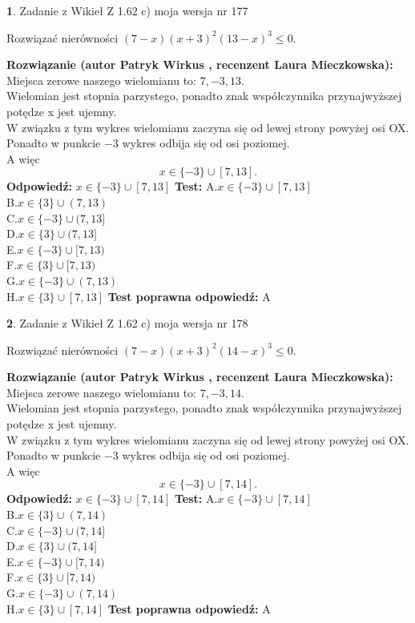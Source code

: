 \documentclass[12pt, a4paper]{article}
\theoremstyle{definition} %
\newtheorem{zad}{}
\newcommand{\zadStart}[1]{\begin{zad}#1\newline}
\newcommand{\zadStop}{\end{zad}}
\newcommand{\rozwStart}[2]{\noindent \textbf{Rozwiązanie (autor #1 , recenzent #2): }\newline}
\newcommand{\rozwStop}{\newline}
\newcommand{\odpStart}{\noindent \textbf{Odpowiedź:}\newline}
\newcommand{\odpStop}{\newline}
\newcommand{\testStart}{\noindent \textbf{Test:}\newline}
\newcommand{\testStop}{\newline}
\newcommand{\kluczStart}{\noindent \textbf{Test poprawna odpowiedź:}\newline}
\newcommand{\kluczStop}{\newline}
\begin{document}
\zadStart{Zadanie z Wikieł Z 1.62 c) moja wersja nr 177}

Rozwiązać nierówności $(7-x)(x+3)^{2}(13-x)^{3}\le0$.
\zadStop
\rozwStart{Patryk Wirkus}{Laura Mieczkowska}
Miejsca zerowe naszego wielomianu to: $7, -3, 13$.\\
Wielomian jest stopnia parzystego, ponadto znak współczynnika przy\linebreak najwyższej potędze x jest ujemny.\\ W związku z tym wykres wielomianu zaczyna się od lewej strony powyżej osi OX.\\
Ponadto w punkcie $-3$ wykres odbija się od osi poziomej.\\
A więc $$x \in \{-3\} \cup [7,13].$$
\rozwStop
\odpStart
$x \in \{-3\} \cup [7,13]$
\odpStop
\testStart
A.$x \in \{-3\} \cup [7,13]$\\
B.$x \in \{3\} \cup (7,13)$\\
C.$x \in \{-3\} \cup (7,13]$\\
D.$x \in \{3\} \cup (7,13]$\\
E.$x \in \{-3\} \cup [7,13)$\\
F.$x \in \{3\} \cup [7,13)$\\
G.$x \in \{-3\} \cup (7,13)$\\
H.$x \in \{3\} \cup [7,13]$
\testStop
\kluczStart
A
\kluczStop



\zadStart{Zadanie z Wikieł Z 1.62 c) moja wersja nr 178}

Rozwiązać nierówności $(7-x)(x+3)^{2}(14-x)^{3}\le0$.
\zadStop
\rozwStart{Patryk Wirkus}{Laura Mieczkowska}
Miejsca zerowe naszego wielomianu to: $7, -3, 14$.\\
Wielomian jest stopnia parzystego, ponadto znak współczynnika przy\linebreak najwyższej potędze x jest ujemny.\\ W związku z tym wykres wielomianu zaczyna się od lewej strony powyżej osi OX.\\
Ponadto w punkcie $-3$ wykres odbija się od osi poziomej.\\
A więc $$x \in \{-3\} \cup [7,14].$$
\rozwStop
\odpStart
$x \in \{-3\} \cup [7,14]$
\odpStop
\testStart
A.$x \in \{-3\} \cup [7,14]$\\
B.$x \in \{3\} \cup (7,14)$\\
C.$x \in \{-3\} \cup (7,14]$\\
D.$x \in \{3\} \cup (7,14]$\\
E.$x \in \{-3\} \cup [7,14)$\\
F.$x \in \{3\} \cup [7,14)$\\
G.$x \in \{-3\} \cup (7,14)$\\
H.$x \in \{3\} \cup [7,14]$
\testStop
\kluczStart
A
\kluczStop
\end{document}
